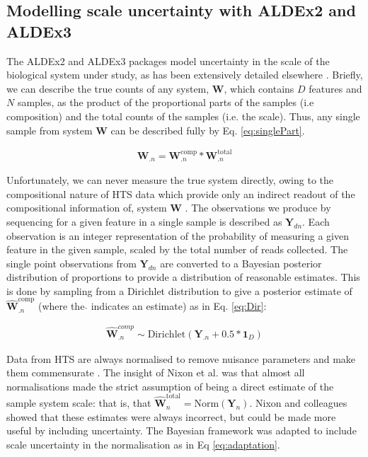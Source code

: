 \documentclass[10pt,letterpaper]{article}
\begin{document}
\subsection*{Modelling scale uncertainty with ALDEx2 and ALDEx3}
The ALDEx2 and ALDEx3 packages model uncertainty in the scale of the biological system under study, as has been extensively detailed elsewhere \cite{nixon_incorporating_2025, gloor_explicit_2025}. Briefly, we can describe the true counts of any system, $\mathbf{W}$, which contains $D$ features and $N$ samples, as the product of the proportional parts of the samples (i.e  composition) and the total counts of the samples (i.e. the  scale). Thus, any single sample from  system $\mathbf{W}$ can be described fully by Eq. \ref{eq:singlePart}.

\begin{eqnarray}
	\label{eq:singlePart}
	\mathbf{W}_{.n} = \mathbf{W}^{\mathrm{comp}}_{.n} * \mathbf{W}^{\mathrm{total}}_{.n} 
\end{eqnarray}

Unfortunately, we can never measure the true system directly, owing to the compositional nature of HTS data which provide only an indirect readout of the compositional information of, system $\mathbf{W}$ \cite{lovell_proportions_2011, gloor_microbiome_2017}. The observations we produce by sequencing for a given feature in a single sample is described as $\mathbf{Y}_{dn}$. Each observation is an integer representation of the probability of measuring a given feature in the given sample, scaled by the total number of reads collected\cite{fernandes:2013}. The single  point observations from $\mathbf{Y}_{dn}$ are converted to a Bayesian posterior distribution of proportions \cite{fernandes:2013} to provide a distribution of reasonable estimates. This is done by sampling from a Dirichlet distribution to give a posterior estimate of $\hat{\mathbf{W}}^{\mathrm{comp}}_{.n}$ \cite{fernandes:2014} (where the $\hat{}$ indicates an estimate) as in Eq. \ref{eq:Dir}:

\begin{eqnarray}
	\label{eq:Dir}
	\hat{\mathbf{W}}^{comp}_{.n} \sim \mathrm{Dirichlet}(\mathbf{Y}_{.n} + 0.5 * \mathbf{1}_{D})
\end{eqnarray}

Data from HTS are always normalised to remove nuisance parameters and make them commensurate \cite{robinson_scaling_2010}. The insight of Nixon et al. \cite{nixon_scale_2024} was that almost all normalisations made the strict assumption of being a direct estimate of the sample system scale: that is, that $\hat{\mathbf{W}}^{\mathrm{total}}_{n} = \mathrm{Norm}(\mathbf{Y}_{n})$. Nixon and colleagues showed that these estimates were always incorrect, but could be made more useful by including  uncertainty. The Bayesian framework was adapted to include scale uncertainty in the normalisation as in Eq \ref{eq:adaptation}.
\end{document}
